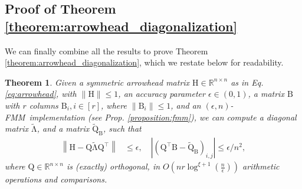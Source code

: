 \documentclass{article}
\newcommand{\labs}{\left|}
\newcommand{\rabs}{\right|}
\newcommand{\lnorm}{\left\|}
\newcommand{\rnorm}{\right\|}
\newcommand{\lpar}{\left(}
\newcommand{\rpar}{\right)}
\newtheorem{theorem}{Theorem}[section]
\newcommand\matB{\boldsymbol{\mathrm{B}}}
\newcommand\matH{\boldsymbol{\mathrm{H}}}
\newcommand\matQ{\boldsymbol{\mathrm{Q}}}
\newcommand\matQtilde{\widetilde{\boldsymbol{\mathrm{Q}}}}
\newcommand\matLambdatilde{\widetilde{\boldsymbol{\mathrm{\Lambda}}}}
\newcommand{\cfmm}{\xi}
\newcommand{\fmmalgo}{FMM} \usepackage[utf8]{inputenc}
\begin{document}
\subsection{Proof of Theorem \ref{theorem:arrowhead_diagonalization}}
We can finally combine all the results to prove Theorem \ref{theorem:arrowhead_diagonalization}, which we restate below for readability.
\begin{theorem}
    \label{theorem:arrowhead_diagonalization_appendix}
    Given a symmetric arrowhead matrix $\matH\in\mathbb{R}^{n\times n}$ as in Eq. \eqref{eq:arrowhead}, with $\|\matH\|\leq 1$, an accuracy parameter $\epsilon\in(0,1)$, a matrix $\matB$ with $r$ columns $\matB_i,i\in[r]$, where $\|\matB_i\|\leq 1$, and an $(\epsilon,n)$-\fmmalgo\   implementation (see Prop. \ref{proposition:fmm}), we can compute a diagonal matrix $\matLambdatilde$, and a matrix
    $\matQtilde_{\matB}$, such that 
    \begin{align*}
        \lnorm \matH-\matQ\matLambdatilde\matQ^\top \rnorm &\leq \epsilon,
        \quad
        \labs \lpar \matQ^\top\matB - \matQtilde_{\matB} \rpar_{i,j}\rabs \leq  \epsilon/n^2,
    \end{align*}
    where 
    $
        \matQ\in\mathbb{R}^{n\times n}
    $ is (exactly) orthogonal, in 
    $
        O\lpar nr\log^{\cfmm+1}(\tfrac{n}{\epsilon})\rpar
    $
    arithmetic operations and comparisons.


\end{theorem}
\end{document}
